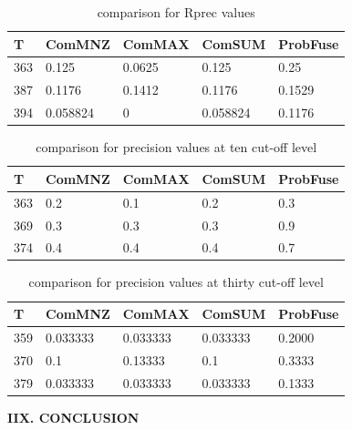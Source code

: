 \documentclass[12pt,journal]{IEEEtran}
\begin{document}
\begin{table}[h!]
\centering
\caption{comparison for Rprec values}
\begin{tabular}{|l|l|l|l|l|}
\hline
T   & ComMNZ   & ComMAX  & ComSUM   & ProbFuse \\ \hline
363 & 0.125    & 0.0625  & 0.125    & 0.25     \\ \hline
387 & 0.1176  & 0.1412 & 0.1176  & 0.1529  \\ \hline
394 & 0.058824 & 0       & 0.058824 & 0.1176  \\  \hline
\end{tabular} 
\end{table}


\begin{table}[h!]
\centering
\caption{comparison for precision values at ten cut-off level}
\begin{tabular}{|l|l|l|l|l|}
\hline
T   & ComMNZ & ComMAX & ComSUM & ProbFuse \\ \hline
363 & 0.2    & 0.1    & 0.2    & 0.3     \\ \hline
369 & 0.3    & 0.3    & 0.3    & 0.9     \\ \hline
374 & 0.4    & 0.4    & 0.4    & 0.7      \\ \hline
\end{tabular}
\end{table}

\begin{table}[h!]
\centering
\caption{comparison for precision values at thirty cut-off level}
\begin{tabular}{|l|l|l|l|l|}
\hline
T   & ComMNZ   & ComMAX   & ComSUM   & ProbFuse \\ \hline
359 & 0.033333 & 0.033333 & 0.033333 & 0.2000  \\ \hline
370 & 0.1      & 0.13333  & 0.1      & 0.3333  \\ \hline
379 & 0.033333 & 0.033333 & 0.033333 & 0.1333     \\ \hline
\end{tabular}
\end{table}

\textbf{IIX. CONCLUSION}
\end{document}
